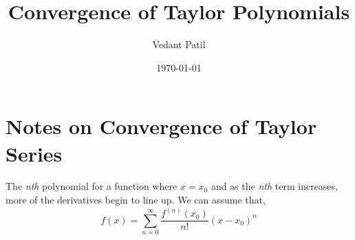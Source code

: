 \documentclass{article}
\begin{document}
\title{Convergence of Taylor Polynomials}
\author{Vedant Patil}
\date{\today}


\section{Notes on Convergence of Taylor Series}
The \textit{nth} polynomial for a function where \( x = x_{0} \) and as the
\textit{nth} term increases, more of the derivatives begin to line up.
We can assume that,
\[
f(x) = \sum_{n=0}^{\infty} \frac{f^{(n)}(x_0)}{n!} (x - x_0)^n
\]
\end{document}
